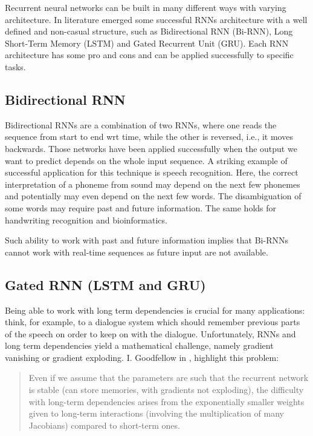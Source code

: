 Recurrent neural networks can be built in many different ways with
varying architecture. In literature emerged some successful RNNs
architecture with a well defined and non-casual structure, such as
Bidirectional RNN (Bi-RNN), Long Short-Term Memory (LSTM) and Gated
Recurrent Unit (GRU). Each RNN architecture has some pro and cons and
can be applied successfully to specific tasks.

\subsection{Bidirectional RNN}

Bidirectional RNNs are a combination of two RNNs, where one reads the
sequence from start to end wrt time, while the other is reversed,
i.e., it moves backwards. Those networks have been applied
successfully when the output we want to predict depends on the whole
input sequence. A striking example of successful application for this
technique is speech recognition. Here, the correct interpretation of a
phoneme from sound may depend on the next few phonemes and potentially
may even depend on the next few words. The disambiguation of some
words may require past and future information. The same holds for
handwriting recognition and bioinformatics.

Such ability to work with past and future information implies that
Bi-RNNs cannot work with real-time sequences as future input are not
available.

\subsection{Gated RNN (LSTM and GRU)}
\label{subsec:gated-rnn}

Being able to work with long term dependencies is crucial for many
applications: think, for example, to a dialogue system which should
remember previous parts of the speech on order to keep on with the
dialogue. Unfortunately, RNNs and long term dependencies yield a
mathematical challenge, namely gradient vanishing or gradient
exploding. I. Goodfellow \etal{} in \cite{goodfellow2016deep},
highlight this problem:

\begin{quote}
  Even if we assume that the parameters are such that the recurrent
  network is stable (can store memories, with gradients not
  exploding), the difficulty with long-term dependencies arises from
  the exponentially smaller weights given to long-term interactions
  (involving the multiplication of many Jacobians) compared to
  short-term ones.
\end{quote}

